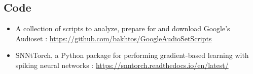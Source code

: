 \documentclass[11pt]{article}
\begin{document}
\subsection{Code}

\begin{itemize}
  \item A collection of scripts to analyze, prepare for and download Google's Audioset : \url{https://github.com/bakhtos/GoogleAudioSetScripts}
        \label{item:google-audioset-reformatted}

  \item SNNtTorch, a Python package for performing gradient-based learning with spiking neural networks : \url{https://snntorch.readthedocs.io/en/latest/} \label{item:snntorch-lib}
\end{itemize}

\pagebreak



\end{document}

